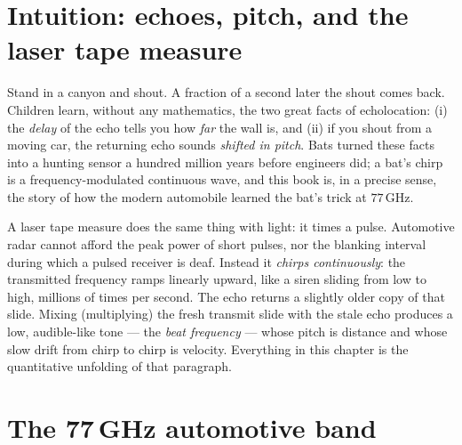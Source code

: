 \documentclass[11pt,oneside]{book}
\begin{document}
\section{Intuition: echoes, pitch, and the laser tape measure}
\label{sec:echo-intuition}

Stand in a canyon and shout. A fraction of a second later the shout comes
back. Children learn, without any mathematics, the two great facts of
echolocation: (i) the \emph{delay} of the echo tells you how \emph{far} the
wall is, and (ii) if you shout from a moving car, the returning echo sounds
\emph{shifted in pitch}. Bats turned these facts into a hunting sensor a
hundred million years before engineers did; a bat's chirp is a
frequency-modulated continuous wave, and this book is, in a precise sense,
the story of how the modern automobile learned the bat's trick at
$77\,\mathrm{GHz}$.

A laser tape measure does the same thing with light: it times a pulse.
Automotive radar cannot afford the peak power of short pulses, nor the
blanking interval during which a pulsed receiver is deaf. Instead it
\emph{chirps continuously}: the transmitted frequency ramps linearly upward,
like a siren sliding from low to high, millions of times per second. The echo
returns a slightly older copy of that slide. Mixing (multiplying) the fresh
transmit slide with the stale echo produces a low, audible-like tone --- the
\emph{beat frequency} --- whose pitch is distance and whose slow drift from
chirp to chirp is velocity. Everything in this chapter is the quantitative
unfolding of that paragraph.

\section{The 77\,GHz automotive band}
\label{sec:band}
\end{document}
